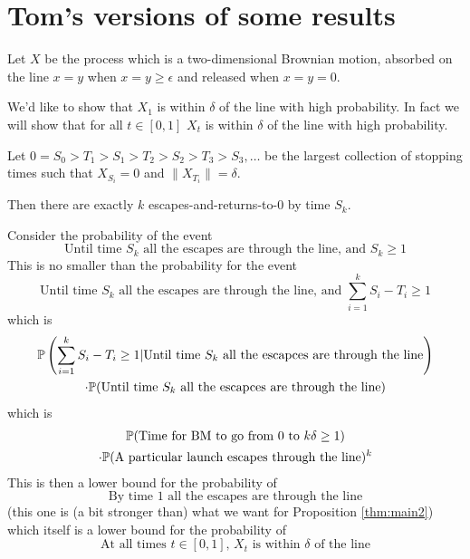 {
  \section{Tom's versions of some results}

  Let $X$ be the process which is a two-dimensional Brownian motion,
  absorbed on the line $x = y$ when $x = y \ge \epsilon$ and released
  when $x = y = 0$.

  \newcommand{\radius}{\delta}

  We'd like to show that $X_1$ is within $\radius$ of the line with
  high probability.  In fact we will show that for all $t \in [0,1]$
  $X_t$ is within $\radius$ of the line with high probability.

  \newcommand{\twonorm}[1]{\|#1\|}

  Let $0 = S_0 > T_1 > S_1 > T_2 > S_2 > T_3 > S_3, \ldots$ be the
  largest collection of stopping times such that $X_{S_i} = 0$ and
  $\twonorm{X_{T_i}} = \radius$.

  Then there are exactly $k$ escapes-and-returns-to-$0$ by time $S_k$.

  Consider the probability of the event
  \[
  \text{Until time $S_k$ all the escapes are through the line, and
    $S_k \ge 1$}
  \]
  This is no smaller than the probability for the event
  \[
  \text{Until time $S_k$ all the escapes are through the line, and
    $\sum_{i=1}^k S_i - T_i \ge 1$}
  \]
  which is 
  \begin{multline*}
  \P\left(\sum_{i=1}^k S_i - T_i \ge 1 | \text{Until time $S_k$ all
    the escapces are through the line} \right) \\ \cdot \P(\text{Until time
      $S_k$ all the escapces are through the line})
  \end{multline*}
  which is
  \begin{multline*}
  \P(\text{Time for BM to go from $0$ to $k\radius \ge 1$})
  \\ \cdot \P(\text{A particular launch escapes through the
    line})^k
  \end{multline*}
  This is then a lower bound for the probability of
  \[
  \text{By time $1$ all the escapes are through the line}
  \]
  (this one is (a bit stronger than) what we want for Proposition
  \ref{thm:main2}) which itself is a lower bound for the probability
  of
  \[
  \text{At all times $t \in [0,1]$, $X_t$ is within $\radius$ of the line}
  \]
}
